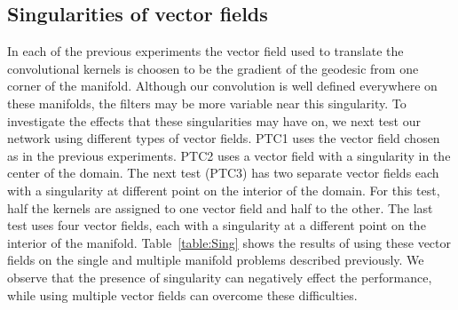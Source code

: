 \documentclass[10pt,twocolumn,letterpaper]{article}
\begin{document}
\subsection{Singularities of vector fields}
In each of the previous experiments the vector field used to translate the convolutional kernels is choosen to be the gradient of the geodesic from one corner of the manifold. Although our convolution is well defined everywhere on these manifolds, the filters may be more variable near this singularity. To investigate the effects that these singularities may have on,  we next test our network using  different types of vector fields. PTC1 uses the vector field chosen as in the previous experiments. PTC2 uses a vector field with a singularity in the center of the domain. The next test (PTC3) has two separate vector fields each with a singularity at different point on the interior of the domain. For this test, half the kernels are assigned to one vector field and half to the other. The last test uses four vector fields, each with a singularity at a different point on the interior of the manifold. Table~\ref{table:Sing} shows the results of using these vector fields on the single and multiple manifold problems described previously. We observe that the presence of singularity can negatively effect the performance, while using multiple vector fields can overcome these difficulties.
\begin{table}[htp]
\begin{center}
\end{center}
\caption{Success rate (SR) comparison of several of our networks on a single (the $4^{th}$ coloum) and on multiple manifolds (the $5^{th}$ coloumn).}
\label{table:Sing}
\end{table}
\end{document}
